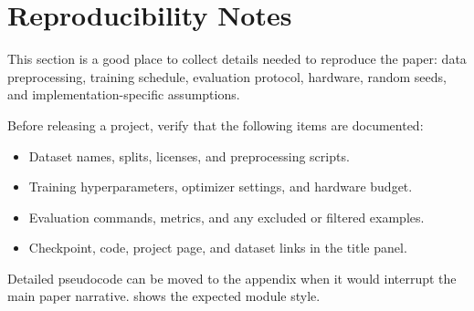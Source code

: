 \section{Reproducibility Notes}
\label{sec:app_reproducibility}

This section is a good place to collect details needed to reproduce the paper:
data preprocessing, training schedule, evaluation protocol, hardware, random
seeds, and implementation-specific assumptions.

Before releasing a project, verify that the following items are documented:

\begin{itemize}
  \item Dataset names, splits, licenses, and preprocessing scripts.
  \item Training hyperparameters, optimizer settings, and hardware budget.
  \item Evaluation commands, metrics, and any excluded or filtered examples.
  \item Checkpoint, code, project page, and dataset links in the title panel.
\end{itemize}

Detailed pseudocode can be moved to the appendix when it would interrupt the
main paper narrative.  shows the expected module
style.


